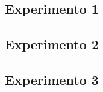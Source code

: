 \documentclass[../main.tex]{subfiles}
\begin{document}
    \subsection{Experimento 1}
    \item 
    \subsection{Experimento 2}
    \item 
    \subsection{Experimento 3}
    
\end{document}
